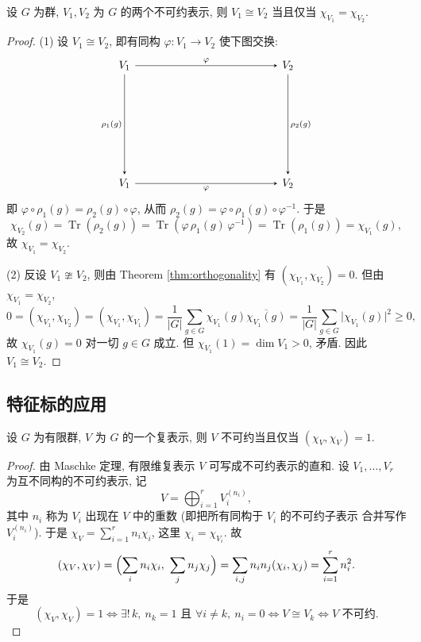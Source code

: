 \begin{theorem}\label{thm:iso-iff-char}
设 $G$ 为群, $V_1,V_2$ 为 $G$ 的两个不可约表示, 则
$V_1\cong V_2$ 当且仅当 $\chi_{V_1}=\chi_{V_2}$.
\end{theorem}

\begin{proof}
\mbox{}\par\vspace{-0.2em}
(1) 设 $V_1\cong V_2$, 即有同构 $\varphi\colon V_1\to V_2$ 使下图交换:
\[
  \begin{tikzcd}[row sep=3.2cm, column sep=4.5cm, arrows={->,>=stealth}]
    V_1 \arrow[r,"\varphi"] \arrow[d,"\rho_1(g)"'] & V_2 \arrow[d,"\rho_2(g)"]\\
    V_1 \arrow[r,"\varphi"'] & V_2
  \end{tikzcd}
\]
即 $\varphi\circ\rho_1(g)=\rho_2(g)\circ\varphi$, 从而
$\rho_2(g)=\varphi\circ\rho_1(g)\circ\varphi^{-1}$. 于是
\[
  \chi_{V_2}(g)=\operatorname{Tr}(\rho_2(g))
  =\operatorname{Tr}(\varphi\,\rho_1(g)\,\varphi^{-1})=\operatorname{Tr}(\rho_1(g))=\chi_{V_1}(g),
\]
故 $\chi_{V_1}=\chi_{V_2}$.

(2) 反设 $V_1\ncong V_2$, 则由 Theorem \ref{thm:orthogonality} 有
$(\chi_{V_1},\chi_{V_2})=0$. 但由 $\chi_{V_1}=\chi_{V_2}$,
\[
  0=(\chi_{V_1},\chi_{V_2})=(\chi_{V_1},\chi_{V_1})
  =\frac{1}{|G|}\sum_{g\in G}\chi_{V_1}(g)\overline{\chi_{V_1}(g)}
  =\frac{1}{|G|}\sum_{g\in G}\bigl|\chi_{V_1}(g)\bigr|^2\ge 0,
\]
故 $\chi_{V_1}(g)=0$ 对一切 $g\in G$ 成立. 但 $\chi_{V_1}(1)=\dim V_1>0$, 矛盾.
因此 $V_1\cong V_2$.
\end{proof}

\subsection{特征标的应用}

\begin{theorem}[不可约表示的判定]\label{thm:irreducible-criterion}
设 $G$ 为有限群, $V$ 为 $G$ 的一个复表示, 则 $V$ 不可约当且仅当
$(\chi_V,\chi_V)=1$.
\end{theorem}

\begin{proof}
由 Maschke 定理, 有限维复表示 $V$ 可写成不可约表示的直和. 设
$V_1,\dots,V_r$ 为互不同构的不可约表示, 记
\[
  V=\bigoplus_{i=1}^{r}V_i^{(n_i)},
\]
其中 $n_i$ 称为 $V_i$ 出现在 $V$ 中的重数 (即把所有同构于 $V_i$ 的不可约子表示
合并写作 $V_i^{(n_i)}$). 于是 $\chi_V=\sum_{i=1}^{r}n_i\chi_i$, 这里 $\chi_i=\chi_{V_i}$. 故
\[
  (\chi_V,\chi_V)=\Bigl(\sum_i n_i\chi_i,\ \sum_j n_j\chi_j\Bigr)
  =\sum_{i,j}n_in_j(\chi_i,\chi_j)=\sum_{i=1}^{r}n_i^2 .
\]
于是
\[
  (\chi_V,\chi_V)=1
  \iff \exists!\,k,\ n_k=1 \text{ 且 } \forall i\neq k,\ n_i=0
  \iff V\cong V_k
  \iff V \text{ 不可约}.
\]
\end{proof}

